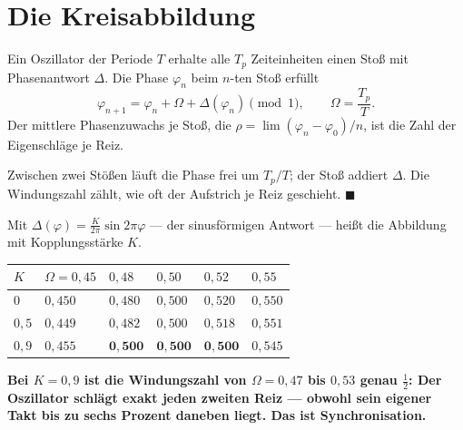\section{Die Kreisabbildung}

\begin{merksatz}
Ein Oszillator der Periode $T$ erhalte alle $T_p$ Zeiteinheiten einen Stoß mit Phasenantwort $\Delta$. Die Phase $\varphi_n$ beim $n$-ten Stoß erfüllt
\[ \varphi_{n+1} = \varphi_n + \Omega + \Delta(\varphi_n) \pmod 1, \qquad \Omega = \frac{T_p}{T} . \]
Der mittlere Phasenzuwachs je Stoß, die  $\rho = \lim(\varphi_n - \varphi_0)/n$, ist die Zahl der Eigenschläge je Reiz.

Zwischen zwei Stößen läuft die Phase frei um $T_p/T$; der Stoß addiert $\Delta$. Die Windungszahl zählt, wie oft der Aufstrich je Reiz geschieht. $\blacksquare$

Mit $\Delta(\varphi) = \frac{K}{2\pi}\sin 2\pi\varphi$ --- der sinusförmigen Antwort --- heißt die Abbildung  mit Kopplungsstärke $K$.

\begin{center}
{\small
\renewcommand{\arraystretch}{1.46}
\begin{tabular}{@{}P{1.4cm}P{1.4cm}P{1.4cm}P{1.4cm}P{1.4cm}P{1.4cm}@{}}
\toprule
$K$ & $\Omega = 0{,}45$ & $0{,}48$ & $0{,}50$ & $0{,}52$ & $0{,}55$\\
\midrule
$0$ & $0{,}450$ & $0{,}480$ & $0{,}500$ & $0{,}520$ & $0{,}550$\\
$0{,}5$ & $0{,}449$ & $0{,}482$ & $0{,}500$ & $0{,}518$ & $0{,}551$\\
$0{,}9$ & $0{,}455$ & $\mathbf{0{,}500}$ & $\mathbf{0{,}500}$ & $\mathbf{0{,}500}$ & $0{,}545$\\
\bottomrule
\end{tabular}}
\end{center}

\begin{center}
\begin{minipage}{0.9\textwidth}
\textbf{Bei $K = 0{,}9$ ist die Windungszahl von $\Omega = 0{,}47$ bis $0{,}53$ genau $\tfrac12$: Der Oszillator schlägt exakt jeden zweiten Reiz --- obwohl sein eigener Takt bis zu sechs Prozent daneben liegt. Das ist Synchronisation.}
\end{minipage}
\end{center}
\end{merksatz}


